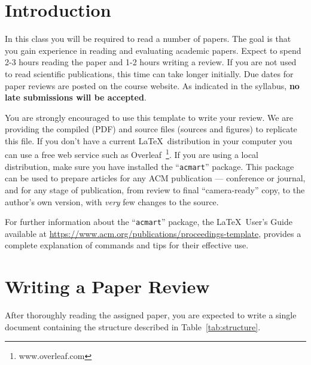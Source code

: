 \documentclass[acmsmall,nonacm]{acmart}
\begin{document}
\section{Introduction}

In this class you will be required to read a number of papers.  The goal is that you gain experience in reading and evaluating academic papers.  Expect to spend 2-3 hours reading the paper and 1-2 hours writing a review.  If you are not used to read scientific publications, this time can take longer initially.  Due dates for paper reviews are posted on the course website.  As indicated in the syllabus, {\bf no late submissions will be accepted}.

You are strongly encouraged to use this template to write your review.  We are providing the compiled (PDF) and source files (sources and figures) to replicate this file.  If you don't have a current \LaTeX\ distribution in your computer you can use a free web service such as Overleaf~\footnote{www.overleaf.com}.  If you are using a local distribution, make sure you have installed the ``\verb|acmart|'' package.  This package can be used to prepare articles for any ACM publication --- conference or journal, and for any stage
of publication, from review to final ``camera-ready'' copy, to the
author's own version, with {\it very} few changes to the source.

For further information about the ``\verb|acmart|'' package, the {\LaTeX\ User's Guide} available at \url{https://www.acm.org/publications/proceedings-template}, provides a complete explanation of commands and tips for their effective use.

\section{Writing a Paper Review}

After thoroughly reading the assigned paper, you are expected to write a single document containing the structure described in Table~\ref{tab:structure}.
 
\end{document}
